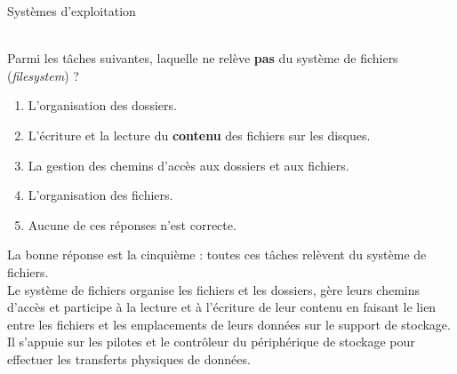 \begin{section}{Systèmes d'exploitation}
    
    
     \begin{Exercice}[2 minutes]\\
    Parmi les tâches suivantes, laquelle ne relève \textbf{pas} du système de fichiers (\textit{filesystem}) ?
        \begin{enumerate}
            \item L'organisation des dossiers.
            \item L'écriture et la lecture du \textbf{contenu} des fichiers sur les disques.
            \item La gestion des chemins d'accès aux dossiers et aux fichiers.
            \item L'organisation des fichiers.
            \item  Aucune de ces réponses n'est correcte.
        \end{enumerate}
    \end{Exercice}
    
    \begin{solution}
        La bonne réponse est la cinquième : toutes ces tâches relèvent du système de fichiers. \\
        Le système de fichiers organise les fichiers et les dossiers, gère leurs chemins d'accès et participe à la lecture et à l'écriture de leur contenu en faisant le lien entre les fichiers et les emplacements de leurs données sur le support de stockage. Il s'appuie sur les pilotes et le contrôleur du périphérique de stockage pour effectuer les transferts physiques de données. \\
    \end{solution}
    
\end{section}

